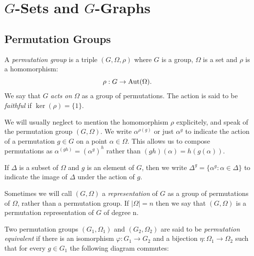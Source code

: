 \chapter{$G$-Sets and $G$-Graphs}

\section{Permutation Groups}

\begin{definition}
A \emph{permutation group} is a triple $(G, \Omega, \rho)$
where $G$ is a group, $\Omega$ is a set and $\rho$
is a homomorphism:
$$ \rho : G \to \operatorname{Aut}(\Omega). $$
We say that $G$ {\it acts on} $\Omega$ as a group of permutations.
The action is said to be \emph{faithful} if $\ker(\rho) = \{1\}$.
\end{definition}


We will usually neglect to mention the homomorphism $\rho$ explicitely,
and speak of the permutation group $(G, \Omega)$.
We write $\alpha^{\rho(g)}$ or just $\alpha^g$ to indicate
the action of a permutation $g \in G$ on a point $\alpha \in \Omega$. 
This allows us to compose permutations as 
$\alpha^{(gh)} = (\alpha^{g})^{h}$
rather than $(gh)(\alpha) = h(g(\alpha))$.

If $\Delta$ is a subset of $\Omega$ and $g$ is an element of $G$, then we write
$\Delta^g = \{ \alpha^g : \alpha \in \Delta \}$
to indicate the image of $\Delta$ under the action of $g$.

\hfill \break
Sometimes we will call $(G,\Omega)$ a \emph{representation} 
of $G$ as a group of permutations of $\Omega$, rather than a permutation group.
If $|\Omega| = n$ then we say that $(G,\Omega)$ is a permutation
representation of $G$ of degree n.

\begin{definition}
Two permutation groups $(G_1, \Omega_1)$ and
$(G_2, \Omega_2)$ are said to be \emph{permutation equivalent}
if there is an isomorphism $\varphi : G_1 \to G_2$
and a bijection $\eta : \Omega_1 \to \Omega_2$ 
such that for every $g \in G_1$ the following diagram commutes:

\centerline{
}
\end{definition} 

